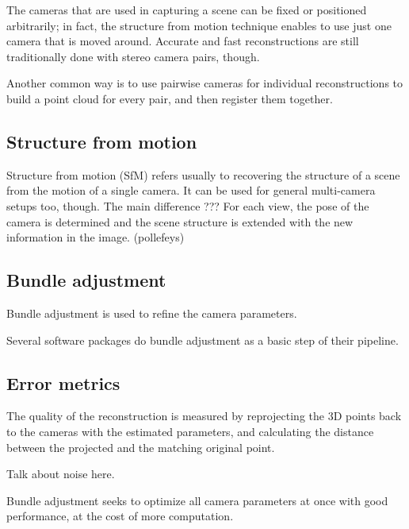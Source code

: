 The cameras that are used in capturing a scene can be fixed or positioned arbitrarily; in fact, the structure from motion technique \cite{snavely2006photo,fitzgibbon1998automatic} enables to use just one camera that is moved around.
Accurate and fast reconstructions are still traditionally done with stereo camera pairs, though.

Another common way is to use pairwise cameras for individual reconstructions to build a point cloud for every pair, and then register them together. \cite{bradley2010high}


\subsection{Structure from motion} %

Structure from motion (SfM) refers usually to recovering the structure of a scene from the motion of a single camera.
It can be used for general multi-camera setups too, though.
The main difference ??? %
For each view, the pose of the camera is determined and the scene structure is extended with the new information in the image.
(pollefeys)


\subsection{Bundle adjustment} %

Bundle adjustment is used to refine the camera parameters.

Several software packages do bundle adjustment as a basic step of their pipeline.


\subsection{Error metrics} %

The quality of the reconstruction is measured by reprojecting the 3D points back to the cameras with the estimated parameters, and calculating the distance between the projected and the matching original point. \cite{hartley03multiview}

Talk about noise here.

Bundle adjustment \cite{wu2011multicore} seeks to optimize all camera parameters at once with good performance, at the cost of more computation.

